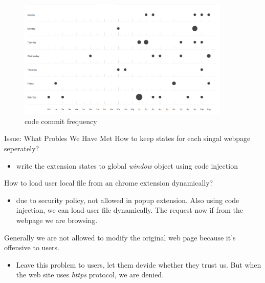 \documentclass{beamer}
\begin{document}
\begin{frame}
\begin{center}
    \begin{figure}
        \includegraphics[width=0.9\textwidth]{./images/code_frequency.png}
        \caption{code commit frequency}
    \end{figure}
\end{center}
\end{frame}

\begin{frame}{Issue: What Probles We Have Met}
How to keep states for each singal webpage seperately?
\begin{itemize}
    \item write the extension states to global \emph{window} object using code injection
\end{itemize}

How to load user local file from an chrome extension dynamically?
\begin{itemize}
    \item due to security policy, not allowed in popup extension. Also using code injection, we can load user file dynamically. The request now if from the webpage we are browsing.
\end{itemize}

Generally we are not allowed to modify the original web page because it's offensive to users.
\begin{itemize}
    \item Leave this problem to users, let them devide whether they trust us. But when the web site uses \emph{https} protocol, we are denied.
\end{itemize}

\end{frame}

\end{document}
